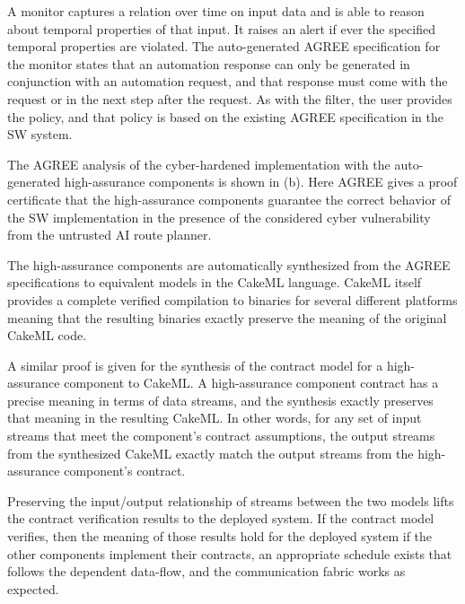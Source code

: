 A monitor captures a relation over time on input data and is able to reason about temporal properties of that input. It raises an alert if ever the specified temporal properties are violated. The auto-generated AGREE specification for the monitor states that an automation response can only be generated in conjunction with an automation request, and that response must come with the request or in the next step after the request. As with the filter, the user provides the policy, and that policy is based on the existing AGREE specification in the SW system.

The AGREE analysis of the cyber-hardened implementation with the auto-generated high-assurance components is shown in (b). Here AGREE gives a proof certificate that the high-assurance components guarantee the correct behavior of the SW implementation in the presence of the considered cyber vulnerability from the untrusted AI route planner.

The high-assurance components are automatically synthesized from the AGREE specifications to equivalent models in the CakeML language. CakeML itself provides a complete verified compilation to binaries for several different platforms meaning that the resulting binaries exactly preserve the meaning of the original CakeML code. 

A similar proof is given for the synthesis of the contract model for a high-assurance component to CakeML. A high-assurance component contract has a precise meaning in terms of data streams, and the synthesis exactly preserves that meaning in the resulting CakeML. In other words, for any set of input streams that meet the component's contract assumptions, the output streams from the synthesized CakeML exactly match the output streams from the high-assurance component's contract. 

Preserving the input/output relationship of streams between the two models lifts the contract verification results to the deployed system. If the contract model verifies, then the meaning of those results hold for the deployed system if the other components implement their contracts, an appropriate schedule exists that follows the dependent data-flow, and the communication fabric works as expected.